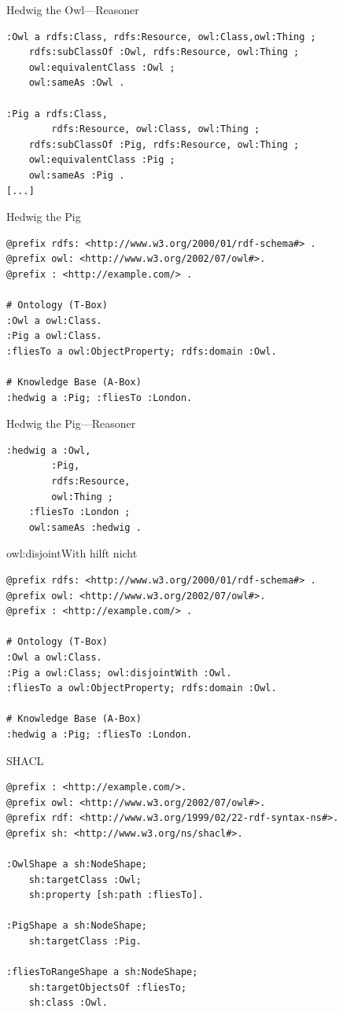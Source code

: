 \documentclass[14pt,aspectratio=1610]{beamer}
\begin{document}
\begin{frame}[fragile]{Hedwig the Owl---Reasoner}
\small
\begin{lstlisting}
:Owl a rdfs:Class, rdfs:Resource, owl:Class,owl:Thing ;
    rdfs:subClassOf :Owl, rdfs:Resource, owl:Thing ;
    owl:equivalentClass :Owl ;
    owl:sameAs :Owl .

:Pig a rdfs:Class,
        rdfs:Resource, owl:Class, owl:Thing ;
    rdfs:subClassOf :Pig, rdfs:Resource, owl:Thing ;
    owl:equivalentClass :Pig ;
    owl:sameAs :Pig .
[...]
\end{lstlisting}
\end{frame}

\begin{frame}[fragile]{Hedwig the Pig}
\small
\begin{lstlisting}
@prefix rdfs: <http://www.w3.org/2000/01/rdf-schema#> .
@prefix owl: <http://www.w3.org/2002/07/owl#>.
@prefix : <http://example.com/> .

# Ontology (T-Box)
:Owl a owl:Class.
:Pig a owl:Class.
:fliesTo a owl:ObjectProperty; rdfs:domain :Owl.

# Knowledge Base (A-Box)
:hedwig a :Pig; :fliesTo :London.
\end{lstlisting}
\end{frame}

\begin{frame}[fragile]{Hedwig the Pig---Reasoner}
\begin{lstlisting}
:hedwig a :Owl,
        :Pig,
        rdfs:Resource,
        owl:Thing ;
    :fliesTo :London ;
    owl:sameAs :hedwig .
\end{lstlisting}
\end{frame}

\begin{frame}[fragile]{owl:disjointWith hilft nicht}
\small
\begin{lstlisting}
@prefix rdfs: <http://www.w3.org/2000/01/rdf-schema#> .
@prefix owl: <http://www.w3.org/2002/07/owl#>.
@prefix : <http://example.com/> .

# Ontology (T-Box)
:Owl a owl:Class.
:Pig a owl:Class; owl:disjointWith :Owl.
:fliesTo a owl:ObjectProperty; rdfs:domain :Owl.

# Knowledge Base (A-Box)
:hedwig a :Pig; :fliesTo :London.
\end{lstlisting}
\end{frame}

\begin{frame}[fragile]{SHACL}
\small
\begin{lstlisting}
@prefix : <http://example.com/>.
@prefix owl: <http://www.w3.org/2002/07/owl#>.
@prefix rdf: <http://www.w3.org/1999/02/22-rdf-syntax-ns#>.
@prefix sh: <http://www.w3.org/ns/shacl#>.

:OwlShape a sh:NodeShape;
    sh:targetClass :Owl;    
    sh:property [sh:path :fliesTo].

:PigShape a sh:NodeShape;
    sh:targetClass :Pig.

:fliesToRangeShape a sh:NodeShape;                  
    sh:targetObjectsOf :fliesTo;        
    sh:class :Owl.
\end{lstlisting}
\end{frame}
\end{document}
